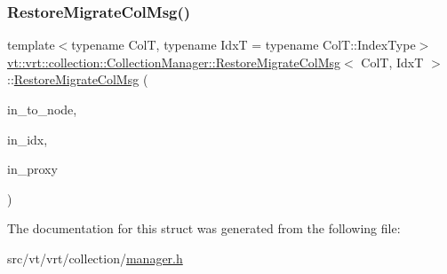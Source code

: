 \mbox{\label{structvt_1_1vrt_1_1collection_1_1_collection_manager_1_1_restore_migrate_col_msg_aa54ac298acb57290f34ea4dbd6f352f1}} 
\subsubsection{\texorpdfstring{Restore\+Migrate\+Col\+Msg()}{RestoreMigrateColMsg()}\hspace{0.1cm}{\footnotesize\ttfamily [2/2]}}
{\footnotesize\ttfamily template$<$typename ColT, typename IdxT = typename Col\+T\+::\+Index\+Type$>$ \\
\hyperlink{structvt_1_1vrt_1_1collection_1_1_collection_manager_1_1_restore_migrate_col_msg}{vt\+::vrt\+::collection\+::\+Collection\+Manager\+::\+Restore\+Migrate\+Col\+Msg}$<$ ColT, IdxT $>$\+::\hyperlink{structvt_1_1vrt_1_1collection_1_1_collection_manager_1_1_restore_migrate_col_msg}{Restore\+Migrate\+Col\+Msg} (\begin{DoxyParamCaption}\item[{\hyperlink{namespacevt_a866da9d0efc19c0a1ce79e9e492f47e2}{Node\+Type}}]{in\+\_\+to\+\_\+node,  }\item[{IdxT}]{in\+\_\+idx,  }\item[{\hyperlink{structvt_1_1vrt_1_1collection_1_1_collection_manager_a56458ed7f9bb22b631b9b3a745f42f94}{Collection\+Proxy\+Wrap\+Type}$<$ ColT $>$}]{in\+\_\+proxy }\end{DoxyParamCaption})\hspace{0.3cm}{\ttfamily [inline]}}



The documentation for this struct was generated from the following file\+:\begin{DoxyCompactItemize}
\item 
src/vt/vrt/collection/\hyperlink{vrt_2collection_2manager_8h}{manager.\+h}\end{DoxyCompactItemize}
